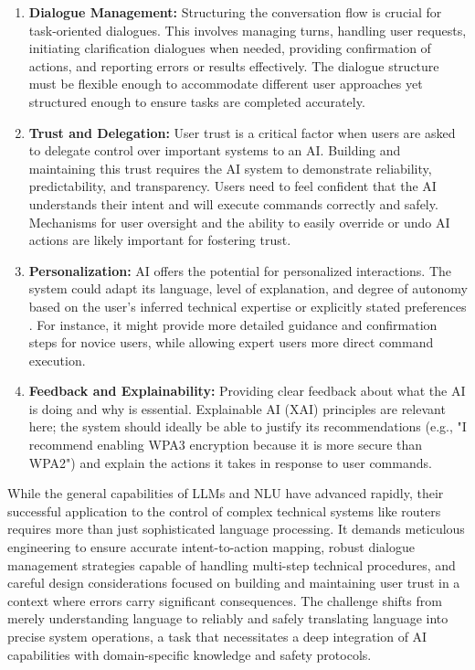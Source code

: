 \begin{enumerate}
\item \textbf{Dialogue Management:} Structuring the conversation flow is crucial for task-oriented dialogues. This involves managing turns, handling user requests, initiating clarification dialogues when needed, providing confirmation of actions, and reporting errors or results effectively. The dialogue structure must be flexible enough to accommodate different user approaches yet structured enough to ensure tasks are completed accurately.

\item \textbf{Trust and Delegation:} User trust is a critical factor when users are asked to delegate control over important systems to an AI. Building and maintaining this trust requires the AI system to demonstrate reliability, predictability, and transparency. Users need to feel confident that the AI understands their intent and will execute commands correctly and safely. Mechanisms for user oversight and the ability to easily override or undo AI actions are likely important for fostering trust.

\item \textbf{Personalization:} AI offers the potential for personalized interactions. The system could adapt its language, level of explanation, and degree of autonomy based on the user's inferred technical expertise or explicitly stated preferences \cite{parental_controls_value}. For instance, it might provide more detailed guidance and confirmation steps for novice users, while allowing expert users more direct command execution.

\item \textbf{Feedback and Explainability:} Providing clear feedback about what the AI is doing and why is essential. Explainable AI (XAI) principles are relevant here; the system should ideally be able to justify its recommendations (e.g., "I recommend enabling WPA3 encryption because it is more secure than WPA2") and explain the actions it takes in response to user commands.
\end{enumerate}

While the general capabilities of LLMs and NLU have advanced rapidly, their successful application to the control of complex technical systems like routers requires more than just sophisticated language processing. It demands meticulous engineering to ensure accurate intent-to-action mapping, robust dialogue management strategies capable of handling multi-step technical procedures, and careful design considerations focused on building and maintaining user trust in a context where errors carry significant consequences. The challenge shifts from merely understanding language to reliably and safely translating language into precise system operations, a task that necessitates a deep integration of AI capabilities with domain-specific knowledge and safety protocols.

